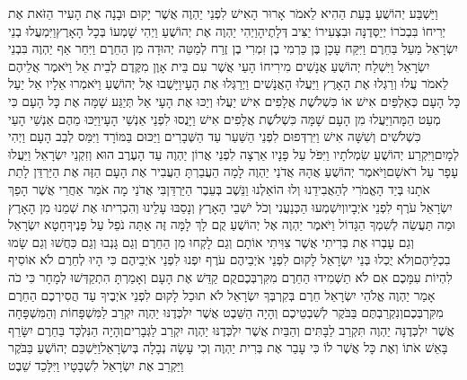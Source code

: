\documentclass[../main/main.tex]{subfiles}
\begin{document}
\begin{multicols*}{\ncols}
וַיַּשְׁבַּע יְהוֹשֻׁעַ בָּעֵת הַהִיא לֵאמֹר אָרוּר הָאִישׁ לִפְנֵי יַהְוֶה אֲשֶׁר יָקוּם וּבָנָה אֶת הָעִיר הַזֹּאת אֶת יְרִיחוֹ בִּבְכֹרוֹ יְיַסְּדֶנָּה וּבִצְעִירוֹ יַצִּיב דְּלָתֶיהָ\PreVerseSpace{}וַיְהִי יַהְוֶה אֶת יְהוֹשֻׁעַ וַיְהִי שָׁמְעוֹ בְּכָל הָאָרֶץ\PreChapterSpace{}וַיִּמְעֲלוּ בְנֵי יִשְׂרָאֵל מַעַל בַּחֵרֶם וַיִּקַּח עָכָן בֶּן כַּרְמִי בֶן זִמְרִי\SubEnd{} בֶן זֶרַח לְמַטֵּה יְהוּדָה מִן הַחֵרֶם וַיִּחַר אַף יַהְוֶה בִּבְנֵי יִשְׂרָאֵל \ClosedSection{}וַיִּשְׁלַח יְהוֹשֻׁעַ אֲנָשִׁים מִירִיחוֹ הָעַי אֲשֶׁר עִם בֵּית אָוֶן מִקֶּדֶם לְבֵית אֵל וַיֹּאמֶר אֲלֵיהֶם לֵאמֹר עֲלוּ וְרַגְּלוּ אֶת הָאָרֶץ וַיַּעֲלוּ הָאֲנָשִׁים וַיְרַגְּלוּ אֶת הָעָי\PreVerseSpace{}וַיָּשֻׁבוּ אֶל יְהוֹשֻׁעַ וַיֹּאמְרוּ אֵלָיו אַל יַעַל כָּל הָעָם כְּאַלְפַּיִם אִישׁ אוֹ כִּשְׁלֹשֶׁת אֲלָפִים אִישׁ יַעֲלוּ וְיַכּוּ אֶת הָעָי אַל תְּיַגַּע שָׁמָּה אֶת כָּל הָעָם כִּי מְעַט הֵמָּה\PreVerseSpace{}וַיַּעֲלוּ מִן הָעָם שָׁמָּה כִּשְׁלֹשֶׁת אֲלָפִים אִישׁ וַיָּנֻסוּ לִפְנֵי אַנְשֵׁי הָעָי\PreVerseSpace{}וַיַּכּוּ מֵהֶם אַנְשֵׁי הָעַי כִּשְׁלֹשִׁים וְשִׁשָּׁה אִישׁ וַיִּרְדְּפוּם לִפְנֵי הַשַּׁעַר עַד הַשְּׁבָרִים וַיַּכּוּם בַּמּוֹרָד וַיִּמַּס לְבַב הָעָם וַיְהִי לְמָיִם\PreVerseSpace{}וַיִּקְרַע יְהוֹשֻׁעַ שִׂמְלֹתָיו וַיִּפֹּל עַל פָּנָיו אַרְצָה לִפְנֵי אֲרוֹן יַהְוֶה עַד הָעֶרֶב הוּא וְזִקְנֵי יִשְׂרָאֵל וַיַּעֲלוּ עָפָר עַל רֹאשָׁם\PreVerseSpace{}וַיֹּאמֶר יְהוֹשֻׁעַ אֲהָהּ אֲדֹנַי יַהְוֶה לָמָה הֵעֲבַרְתָּ הַעֲבִיר אֶת הָעָם הַזֶּה אֶת הַיַּרְדֵּן לָתֵת אֹתָנוּ בְּיַד הָאֱמֹרִי לְהַאֲבִידֵנוּ וְלוּ הוֹאַלְנוּ וַנֵּשֶׁב בְּעֵבֶר הַיַּרְדֵּן\PreVerseSpace{}בִּי אֲדֹנַי מָה אֹמַר אַחֲרֵי אֲשֶׁר הָפַךְ יִשְׂרָאֵל עֹרֶף לִפְנֵי אֹיְבָיו\PreVerseSpace{}וְיִשְׁמְעוּ הַכְּנַעֲנִי וְכֹל יֹשְׁבֵי הָאָרֶץ וְנָסַבּוּ עָלֵינוּ וְהִכְרִיתוּ אֶת שְׁמֵנוּ מִן הָאָרֶץ וּמַה תַּעֲשֵׂה לְשִׁמְךָ הַגָּדוֹל \ClosedSection{}וַיֹּאמֶר יַהְוֶה אֶל יְהוֹשֻׁעַ קֻם לָךְ לָמָּה זֶּה אַתָּה נֹפֵל עַל פָּנֶיךָ\PreVerseSpace{}חָטָא יִשְׂרָאֵל וְגַם עָבְרוּ אֶת בְּרִיתִי אֲשֶׁר צִוִּיתִי אוֹתָם וְגַם לָקְחוּ מִן הַחֵרֶם וְגַם גָּנְבוּ וְגַם כִּחֲשׁוּ וְגַם שָׂמוּ בִכְלֵיהֶם\PreVerseSpace{}וְלֹא יֻכְלוּ בְּנֵי יִשְׂרָאֵל לָקוּם לִפְנֵי אֹיְבֵיהֶם עֹרֶף יִפְנוּ לִפְנֵי אֹיְבֵיהֶם כִּי הָיוּ לְחֵרֶם לֹא אוֹסִיף לִהְיוֹת עִמָּכֶם אִם לֹא תַשְׁמִידוּ הַחֵרֶם מִקִּרְבְּכֶם\PreVerseSpace{}קֻם קַדֵּשׁ אֶת הָעָם וְאָמַרְתָּ הִתְקַדְּשׁוּ לְמָחָר כִּי כֹה אָמַר יַהְוֶה אֱלֹהֵי יִשְׂרָאֵל חֵרֶם בְּקִרְבְּךָ יִשְׂרָאֵל לֹא תוּכַל לָקוּם לִפְנֵי אֹיְבֶיךָ עַד הֲסִירְכֶם הַחֵרֶם מִקִּרְבְּכֶם\PreVerseSpace{}וְנִקְרַבְתֶּם בַּבֹּקֶר לְשִׁבְטֵיכֶם וְהָיָה הַשֵּׁבֶט אֲשֶׁר יִלְכְּדֶנּוּ יַהְוֶה יִקְרַב לַמִּשְׁפָּחוֹת וְהַמִּשְׁפָּחָה אֲשֶׁר יִלְכְּדֶנָּה יַהְוֶה תִּקְרַב לַבָּתִּים וְהַבַּיִת אֲשֶׁר יִלְכְּדֶנּוּ יַהְוֶה יִקְרַב לַגְּבָרִים\PreVerseSpace{}וְהָיָה הַנִּלְכָּד בַּחֵרֶם יִשָּׂרֵף בָּאֵשׁ אֹתוֹ וְאֶת כָּל אֲשֶׁר לוֹ כִּי עָבַר אֶת בְּרִית יַהְוֶה וְכִי עָשָׂה נְבָלָה בְּיִשְׂרָאֵל\PreVerseSpace{}וַיַּשְׁכֵּם יְהוֹשֻׁעַ בַּבֹּקֶר וַיַּקְרֵב אֶת יִשְׂרָאֵל לִשְׁבָטָיו וַיִּלָּכֵד שֵׁבֶט 
\end{multicols*}
\end{document}
